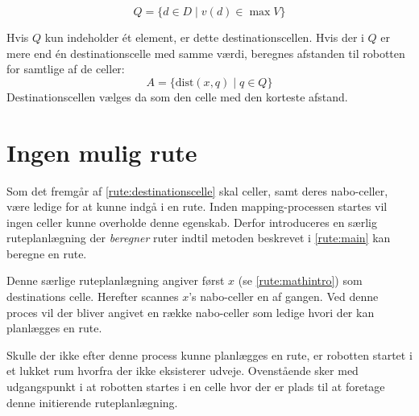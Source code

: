 \begin{equation}
Q = \{ d \in D \mid v(d) \in \max V \}
\end{equation}

Hvis $ Q $ kun indeholder ét element, er dette destinationscellen. 
Hvis der i $Q$ er mere end én destinationscelle med samme værdi, beregnes afstanden til robotten for samtlige af de celler:
\begin{equation}
A = \{ \text{dist}(x,q) \mid q \in Q \}
\end{equation}
Destinationscellen vælges da som den celle med den korteste afstand.

\section{Ingen mulig rute}
Som det fremgår af \cref{rute:destinationscelle} skal celler, samt deres nabo-celler, være ledige for at kunne indgå i en rute.
Inden mapping-processen startes vil ingen celler kunne overholde denne egenskab.
Derfor introduceres en særlig ruteplanlægning der \textit{beregner} ruter indtil metoden beskrevet i \cref{rute:main} kan beregne en rute.

Denne særlige ruteplanlægning angiver først $x$ (se \cref{rute:mathintro}) som destinations celle.
Herefter scannes $x$'s nabo-celler en af gangen.
Ved denne proces vil der bliver angivet en række nabo-celler som ledige hvori der kan planlægges en rute.

Skulle der ikke efter denne process kunne planlægges en rute, er robotten startet i et lukket rum hvorfra der ikke eksisterer udveje.
Ovenstående sker med udgangspunkt i at robotten startes i en celle hvor der er plads til at foretage denne initierende ruteplanlægning.